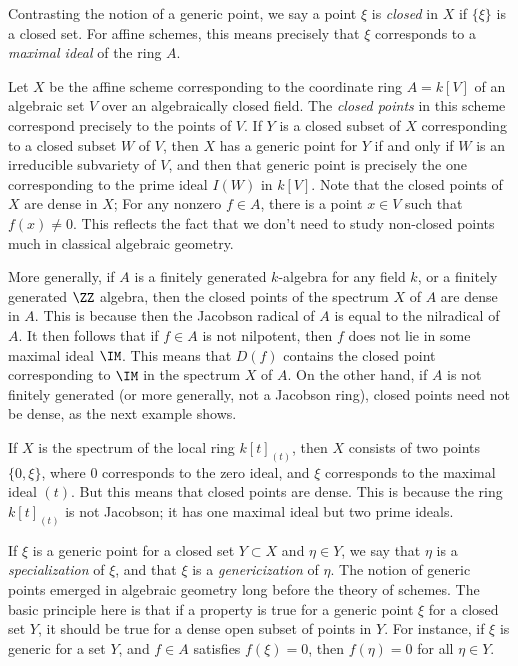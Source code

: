 Contrasting the notion of a generic point, we say a point $\xi$ is \emph{closed} in $X$ if $\{ \xi \}$ is a closed set. For affine schemes, this means precisely that $\xi$ corresponds to a \emph{maximal ideal} of the ring $A$.

\begin{example}
    Let $X$ be the affine scheme corresponding to the coordinate ring $A = k[V]$ of an algebraic set $V$ over an algebraically closed field. The \emph{closed points} in this scheme correspond precisely to the points of $V$. If $Y$ is a closed subset of $X$ corresponding to a closed subset $W$ of $V$, then $X$ has a generic point for $Y$ if and only if $W$ is an irreducible subvariety of $V$, and then that generic point is precisely the one corresponding to the prime ideal $I(W)$ in $k[V]$. Note that the closed points of $X$ are dense in $X$; For any nonzero $f \in A$, there is a point $x \in V$ such that $f(x) \neq 0$. This reflects the fact that we don't need to study non-closed points much in classical algebraic geometry.
\end{example}

More generally, if $A$ is a finitely generated $k$-algebra for any field $k$, or a finitely generated $\ZZ$ algebra, then the closed points of the spectrum $X$ of $A$ are dense in $A$. This is because then the Jacobson radical of $A$ is equal to the nilradical of $A$. It then follows that if $f \in A$ is not nilpotent, then $f$ does not lie in some maximal ideal $\IM$. This means that $D(f)$ contains the closed point corresponding to $\IM$ in the spectrum $X$ of $A$. On the other hand, if $A$ is not finitely generated (or more generally, not a Jacobson ring), closed points need not be dense, as the next example shows.

\begin{example}
    If $X$ is the spectrum of the local ring $k[t]_{(t)}$, then $X$ consists of two points $\{ 0, \xi \}$, where $0$ corresponds to the zero ideal, and $\xi$ corresponds to the maximal ideal $(t)$. But this means that closed points are dense. This is because the ring $k[t]_{(t)}$ is not Jacobson; it has one maximal ideal but two prime ideals.
\end{example}

If $\xi$ is a generic point for a closed set $Y \subset X$ and $\eta \in Y$, we say that $\eta$ is a \emph{specialization} of $\xi$, and that $\xi$ is a \emph{genericization} of $\eta$. The notion of generic points emerged in algebraic geometry long before the theory of schemes. The basic principle here is that if a property is true for a generic point $\xi$ for a closed set $Y$, it should be true for a dense open subset of points in $Y$. For instance, if $\xi$ is generic for a set $Y$, and $f \in A$ satisfies $f(\xi) = 0$, then $f(\eta) = 0$ for all $\eta \in Y$.

